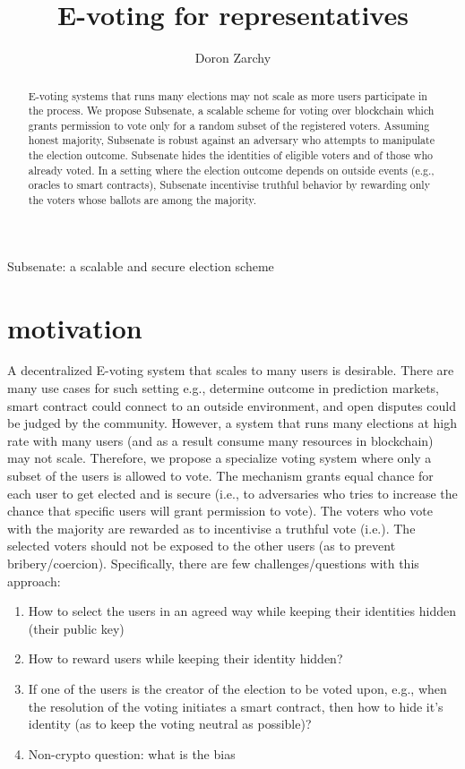 \documentclass[]{article}
\title{E-voting for representatives}
\author{Doron Zarchy}
\begin{document}
\maketitle Subsenate: a scalable and secure election scheme 

\begin{abstract}
 E-voting systems that runs many elections may not scale as more users participate in the process.  
We propose Subsenate, a scalable scheme for voting over blockchain which grants permission to vote only for a random subset of the registered voters. Assuming honest majority, Subsenate is robust against an adversary who attempts to manipulate the election outcome. Subsenate hides the identities of eligible voters and of those who already voted. In a setting where the election outcome depends on outside events (e.g., oracles to smart contracts), Subsenate incentivise truthful behavior by rewarding only the voters whose ballots are among the majority.
\end{abstract}

\section{motivation}
A decentralized E-voting system that scales to many users is desirable. There are many use cases for such setting e.g., determine outcome in prediction markets, smart contract could connect to an outside environment, and open disputes could be judged by the community. However, a system that runs many elections at high rate with many users (and as a result consume many resources in blockchain) may not scale. Therefore, we propose a specialize voting system where only a subset of the users is allowed to vote. The mechanism grants equal chance for each user to get elected and is secure (i.e., to adversaries who tries to increase the chance that specific users will grant permission to vote). The voters who vote with the majority are rewarded as to incentivise a truthful vote (i.e.). The selected voters should not be exposed to the other users (as to prevent bribery/coercion). 
Specifically, there are few challenges/questions with this approach:
\begin{enumerate} 	
	\item How to select the users in an agreed way while keeping their identities hidden (their public key)
	\item How to reward users while keeping their identity hidden?
	\item If one of the users is the creator of the election to be voted upon, e.g., when the resolution of the voting initiates a smart contract,	then how to hide it's identity (as to keep the voting neutral as possible)?
	\item Non-crypto question: what is the bias 
\end{enumerate}
\end{document}
